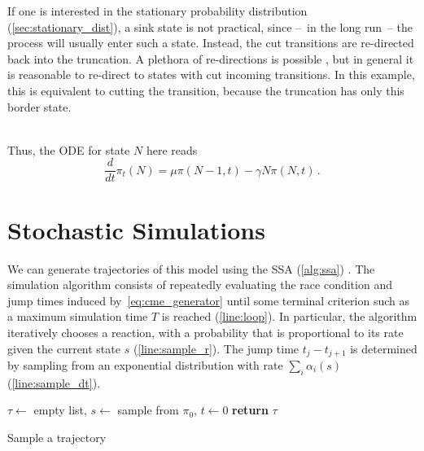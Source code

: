 \begin{example}
If one is interested in the stationary probability distribution (\autoref{sec:stationary_dist}), a sink state is not practical, since --~in the long run~-- the process will usually enter such a state.
Instead, the cut transitions are re-directed back into the truncation.
A plethora of re-directions is possible \cite{gupta2017finite,kuntz2021stationary,spieler2014numerical}, but in general it is reasonable to re-direct to states with cut incoming transitions.
In this example, this is equivalent to cutting the transition, because the truncation has only this border state.
\vspace{2em}\\
\vspace{2em}\\
Thus, the \ac{ODE} for state $N$ here reads
\[
	\frac{d}{dt}\pi_t(N)=\mu \pi(N-1, t) - \gamma N\pi(N, t)\,.
\]
\end{example}

\section{Stochastic Simulations}\label{sec:ssa}
We can generate trajectories of this model using the \acf{SSA} (\autoref{alg:ssa})  \cite{gillespie1977exact}.
The simulation algorithm consists of repeatedly evaluating the race condition and jump times induced by~\eqref{eq:cme_generator} until some terminal criterion such as a maximum simulation time $T$ is reached (\autoref{line:loop}).
In particular, the algorithm iteratively chooses a reaction, with a probability that is
proportional to its rate given the current state $s$ (\autoref{line:sample_r}).
The jump time $t_j- t_{j+1}$ is determined by sampling from an exponential distribution with rate $\sum_i\alpha_i(s)$ (\autoref{line:sample_dt}).
\begin{algorithm}
    $\tau \leftarrow$ empty list, $s\leftarrow$ sample from $\pi_0$, $t\leftarrow 0$\;
    \textbf{return} $\tau$\;
    \caption{\label{alg:ssa}Sample a trajectory}
\end{algorithm}

